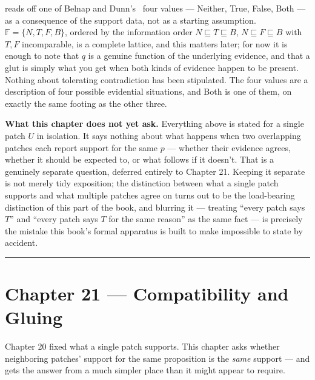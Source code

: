 reads off one of Belnap and Dunn's~\cite{belnap1977,dunn1976} four values --- Neither, True, False,
Both --- as a consequence of the support data, not as a starting
assumption. \(\mathbb{F} = \{N,T,F,B\}\), ordered by the information order
\(N \sqsubseteq T \sqsubseteq B\), \(N \sqsubseteq F \sqsubseteq B\) with \(T,F\)
incomparable, is a complete lattice, and this matters later; for now it
is enough to note that \(q\) is a genuine function of the underlying
evidence, and that a glut is simply what you get when both kinds of
evidence happen to be present. Nothing about tolerating contradiction has
been stipulated. The four values are a description of four possible
evidential situations, and Both is one of them, on exactly the same
footing as the other three.

\textbf{What this chapter does not yet ask.} Everything above is stated for a
single patch \(U\) in isolation. It says nothing about what happens when
two overlapping patches each report support for the same \(p\) --- whether
their evidence agrees, whether it should be expected to, or what follows
if it doesn't. That is a genuinely separate question, deferred entirely
to Chapter 21. Keeping it separate is not merely tidy exposition; the
distinction between what a single patch supports and what multiple
patches agree on turns out to be the load-bearing distinction of this
part of the book, and blurring it --- treating ``every patch says \(T\)'' and
``every patch says \(T\) for the same reason'' as the same fact --- is
precisely the mistake this book's formal apparatus is built to make
impossible to state by accident.

\begin{center}\rule{0.5\linewidth}{0.5pt}\end{center}

\hypertarget{chapter-21-compatibility-and-gluing}{%
\chapter*{Chapter 21 --- Compatibility and Gluing}
\label{chapter-21-compatibility-and-gluing}}

Chapter 20 fixed what a single patch supports. This chapter asks whether
neighboring patches' support for the same proposition is the \emph{same}
support --- and gets the answer from a much simpler place than it might
appear to require.


